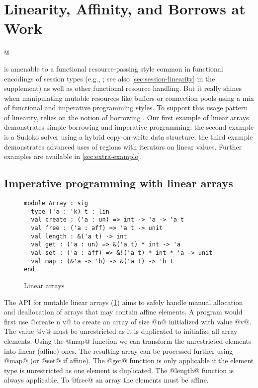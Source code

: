 \section{Linearity, Affinity, and Borrows at Work}
\label{motivation}

\lstMakeShortInline[keepspaces,basicstyle=\small\ttfamily]@

\lang{} is amenable to a functional resource-passing style
common in functional encodings of session types (e.g.,
\cite{DBLP:journals/jfp/Padovani17}; see also
\cref{sec:session-linearity} in the supplement) as well as other
functional resource handling. But it really shines
when manipulating mutable resources like buffers or connection pools
using a mix of functional and imperative programming styles.
%
To support this usage pattern of linearity, \lang{} relies on
the notion of borrowing \cite{DBLP:conf/popl/BoylandR05}. Our first
example of linear arrays demonstrates simple borrowing and
imperative programming; the second example is a Sudoko solver using a
hybrid copy-on-write data structure; the third example demonstrates advanced uses
of regions with iterators on linear values.
Further examples are available in \cref{sec:extra-example}.

\subsection{Imperative programming with linear arrays}
\label{sec:imper-progr}

\begin{figure}[tp]
  \centering
\begin{lstlisting}
module Array : sig
  type ('a : 'k) t : lin
  val create : ('a : un) => int -> 'a -> 'a t
  val free : ('a : aff) => 'a t -> unit
  val length : &('a t) -> int
  val get : ('a : un) => &('a t) * int -> 'a
  val set : ('a : aff) => &!('a t) * int * 'a -> unit
  val map : (&'a -> 'b) -> &('a t) -> 'b t
end
\end{lstlisting}
  \vspace{-15pt}
  \caption{Linear arrays}
  \label{ex:array}
  \label{sig:array}
  \vspace{-10pt}
\end{figure}

The API for mutable linear arrays (\cref{sig:array})
aims to safely handle manual allocation and
deallocation of arrays that may contain affine elements.
A program would first use @create n v@ to create
an array of size @n@ initialized with value
@v@. The value @v@ must be unrestricted as it is duplicated to
initialize all array elements. Using the @map@ function we
can transform the unrestricted elements into linear (affine)
ones. The resulting array can be processed further using @map@ (or @set@ if
affine). The @get@ function is only applicable if the element type
is unrestricted as one element is duplicated. The @length@
function is always applicable. To @free@ an array the elements must be
affine.

